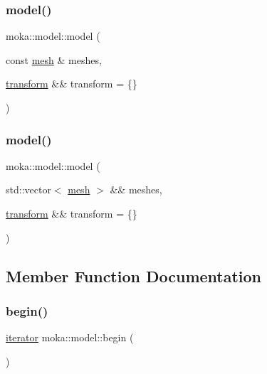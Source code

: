 \subsubsection{\texorpdfstring{model()}{model()}\hspace{0.1cm}{\footnotesize\ttfamily [2/3]}}
{\footnotesize\ttfamily moka\+::model\+::model (\begin{DoxyParamCaption}\item[{const \mbox{\hyperlink{classmoka_1_1mesh}{mesh}} \&}]{meshes,  }\item[{\mbox{\hyperlink{classmoka_1_1transform}{transform}} \&\&}]{transform = {\ttfamily \{\}} }\end{DoxyParamCaption})\hspace{0.3cm}{\ttfamily [explicit]}}

\mbox{\label{classmoka_1_1model_a16c419b2c46e2198d3368f3c5d5f8d47}} 
\subsubsection{\texorpdfstring{model()}{model()}\hspace{0.1cm}{\footnotesize\ttfamily [3/3]}}
{\footnotesize\ttfamily moka\+::model\+::model (\begin{DoxyParamCaption}\item[{std\+::vector$<$ \mbox{\hyperlink{classmoka_1_1mesh}{mesh}} $>$ \&\&}]{meshes,  }\item[{\mbox{\hyperlink{classmoka_1_1transform}{transform}} \&\&}]{transform = {\ttfamily \{\}} }\end{DoxyParamCaption})\hspace{0.3cm}{\ttfamily [explicit]}}



\subsection{Member Function Documentation}
\mbox{\label{classmoka_1_1model_a353f88ac48e7edf13ec5f37803c32b60}} 
\subsubsection{\texorpdfstring{begin()}{begin()}\hspace{0.1cm}{\footnotesize\ttfamily [1/2]}}
{\footnotesize\ttfamily \mbox{\hyperlink{classmoka_1_1model_a2fa7c32a9fe64904609be78bb8d1abdf}{iterator}} moka\+::model\+::begin (\begin{DoxyParamCaption}{ }\end{DoxyParamCaption})}

